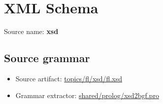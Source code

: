 \chapter{XML Schema}

 Source name: \textbf{xsd}

\section{Source grammar}

\begin{itemize}
\item Source artifact: \href{http://github.com/grammarware/slps/blob/master/topics/fl/xsd/fl.xsd}{topics/fl/xsd/fl.xsd}
\item Grammar extractor: \href{http://github.com/grammarware/slps/blob/master/shared/prolog/xsd2bgf.pro}{shared/prolog/xsd2bgf.pro}
\end{itemize}

